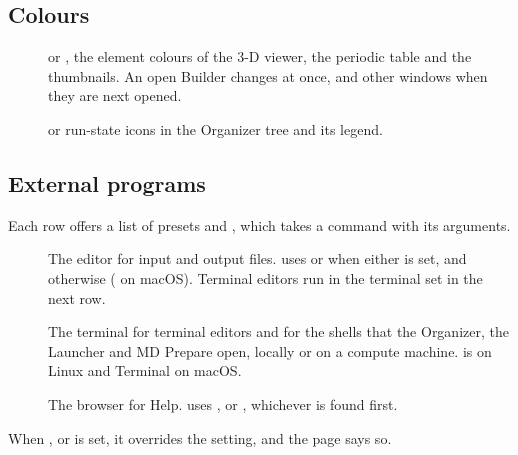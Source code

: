 \subsection*{Colours}
\begin{description}
	\item[]  or , the element colours of the 3-D viewer, the periodic table and the thumbnails. An open Builder changes at once, and other windows when they are next opened.
	\item[]  or  run-state icons in the Organizer tree and its legend.
\end{description}

\subsection*{External programs}
Each row offers a list of presets and , which takes a command with its arguments.
\begin{description}
	\item[] The editor for input and output files.  uses  or  when either is set, and otherwise  ( on macOS). Terminal editors run in the terminal set in the next row.
	\item[] The terminal for terminal editors and for the shells that the Organizer, the Launcher and MD Prepare open, locally or on a compute machine.  is  on Linux and Terminal on macOS.
	\item[] The browser for Help.  uses ,  or , whichever is found first.
\end{description}
When ,  or  is set, it overrides the setting, and the page says so.

